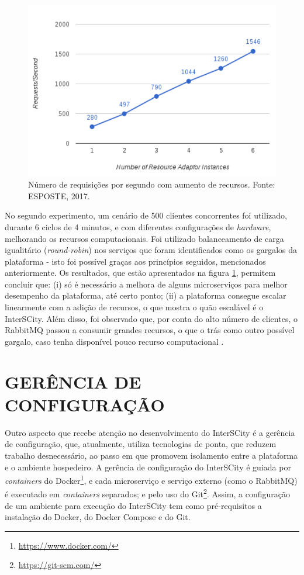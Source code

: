 \begin{figure}
  \centering
    \includegraphics[scale=0.4]{figuras/benchmark2.png}
    \caption{Número de requisições por segundo com aumento de recursos. Fonte: ESPOSTE, 2017.}
  \label{fig:benchmark2}
\end{figure}

No segundo experimento, um cenário de 500 clientes concorrentes foi utilizado, 
durante 6 ciclos de 4 minutos, e com diferentes configurações de
\textit{hardware}, melhorando os recursos computacionais. Foi utilizado
balanceamento de carga igualitário (\textit{round-robin}) nos serviços
que foram identificados como os gargalos da plataforma - isto foi possível
graças aos princípios seguidos, mencionados anteriormente. Os resultados,
que estão apresentados na figura \ref{fig:benchmark2}, permitem concluir que:
(i) só é necessário a melhora de alguns microserviços para melhor desempenho
da plataforma, até certo ponto; (ii) a plataforma consegue escalar linearmente
com a adição de recursos, o que mostra o quão escalável é o InterSCity. Além
disso, foi observado que, por conta do alto número de clientes, o RabbitMQ
passou a consumir grandes recursos, o que o trás como outro possível gargalo,
caso tenha disponível pouco recurso computacional \cite{delesposte2017}.

\section{GERÊNCIA DE CONFIGURAÇÃO}

Outro aspecto que recebe atenção no desenvolvimento do InterSCity é a gerência
de configuração, que, atualmente, utiliza tecnologias de ponta, que reduzem
trabalho desnecessário, ao passo em que promovem isolamento entre a plataforma
e o ambiente hospedeiro. A gerência de configuração do InterSCity é guiada por
\textit{containers} do Docker\footnote{\url{https://www.docker.com/}}, e cada
microserviço e serviço externo (como o RabbitMQ) é executado em
\textit{containers} separados; e pelo uso do
Git\footnote{\url{https://git-scm.com/}}. Assim, a configuração de um ambiente
para execução do InterSCity tem como pré-requisitos a instalação do Docker, do
Docker Compose e do Git.

